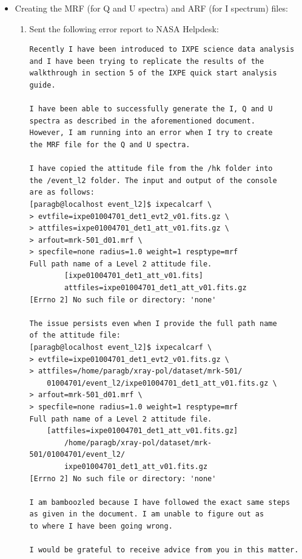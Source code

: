\begin{itemize}
\begin{itemize}
            \item Creating the MRF (for Q and U spectra) and ARF (for I spectrum) files:
            \begin{enumerate}
                \item Sent the following error report to NASA Helpdesk:
                \begin{verbatim}
Recently I have been introduced to IXPE science data analysis
and I have been trying to replicate the results of the
walkthrough in section 5 of the IXPE quick start analysis guide.

I have been able to successfully generate the I, Q and U
spectra as described in the aforementioned document.
However, I am running into an error when I try to create
the MRF file for the Q and U spectra.

I have copied the attitude file from the /hk folder into
the /event_l2 folder. The input and output of the console
are as follows:
[paragb@localhost event_l2]$ ixpecalcarf \
> evtfile=ixpe01004701_det1_evt2_v01.fits.gz \
> attfiles=ixpe01004701_det1_att_v01.fits.gz \
> arfout=mrk-501_d01.mrf \
> specfile=none radius=1.0 weight=1 resptype=mrf
Full path name of a Level 2 attitude file.
        [ixpe01004701_det1_att_v01.fits]
        attfiles=ixpe01004701_det1_att_v01.fits.gz
[Errno 2] No such file or directory: 'none'

The issue persists even when I provide the full path name
of the attitude file:
[paragb@localhost event_l2]$ ixpecalcarf \
> evtfile=ixpe01004701_det1_evt2_v01.fits.gz \
> attfiles=/home/paragb/xray-pol/dataset/mrk-501/
    01004701/event_l2/ixpe01004701_det1_att_v01.fits.gz \
> arfout=mrk-501_d01.mrf \
> specfile=none radius=1.0 weight=1 resptype=mrf
Full path name of a Level 2 attitude file.
    [attfiles=ixpe01004701_det1_att_v01.fits.gz]
        /home/paragb/xray-pol/dataset/mrk-501/01004701/event_l2/
        ixpe01004701_det1_att_v01.fits.gz
[Errno 2] No such file or directory: 'none'

I am bamboozled because I have followed the exact same steps
as given in the document. I am unable to figure out as
to where I have been going wrong.

I would be grateful to receive advice from you in this matter.
                \end{verbatim}
            \end{enumerate}
        \end{itemize}
	\end{itemize}